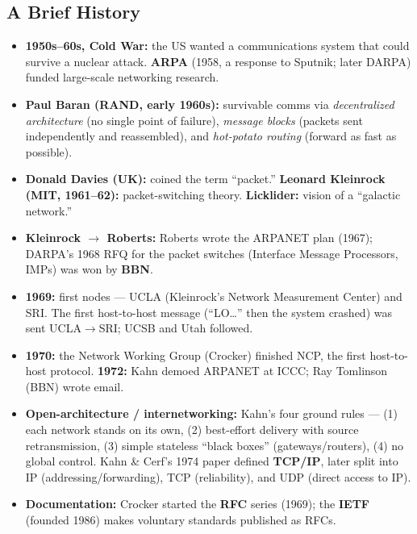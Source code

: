 \documentclass[hidelinks]{article}
\begin{document}
\subsection{A Brief History}

\begin{itemize}
    \item \textbf{1950s--60s, Cold War:} the US wanted a communications
    system that could survive a nuclear attack. \textbf{ARPA} (1958, a
    response to Sputnik; later DARPA) funded large-scale networking research.
    \item \textbf{Paul Baran (RAND, early 1960s):} survivable comms via
    \emph{decentralized architecture} (no single point of failure),
    \emph{message blocks} (packets sent independently and reassembled), and
    \emph{hot-potato routing} (forward as fast as possible).
    \item \textbf{Donald Davies (UK):} coined the term ``packet.''
    \textbf{Leonard Kleinrock (MIT, 1961--62):} packet-switching theory.
    \textbf{Licklider:} vision of a ``galactic network.''
    \item \textbf{Kleinrock $\to$ Roberts:} Roberts wrote the ARPANET plan
    (1967); DARPA's 1968 RFQ for the packet switches (Interface Message
    Processors, IMPs) was won by \textbf{BBN}.
    \item \textbf{1969:} first nodes --- UCLA (Kleinrock's Network Measurement
    Center) and SRI. The first host-to-host message (``LO\dots'' then the
    system crashed) was sent UCLA$\to$SRI; UCSB and Utah followed.
    \item \textbf{1970:} the Network Working Group (Crocker) finished NCP,
    the first host-to-host protocol. \textbf{1972:} Kahn demoed ARPANET at
    ICCC; Ray Tomlinson (BBN) wrote email.
    \item \textbf{Open-architecture / internetworking:} Kahn's four ground
    rules --- (1) each network stands on its own, (2) best-effort delivery
    with source retransmission, (3) simple stateless ``black boxes''
    (gateways/routers), (4) no global control. Kahn \& Cerf's 1974 paper
    defined \textbf{TCP/IP}, later split into IP (addressing/forwarding),
    TCP (reliability), and UDP (direct access to IP).
    \item \textbf{Documentation:} Crocker started the \textbf{RFC} series
    (1969); the \textbf{IETF} (founded 1986) makes voluntary standards
    published as RFCs.
\end{itemize}

\end{document}
